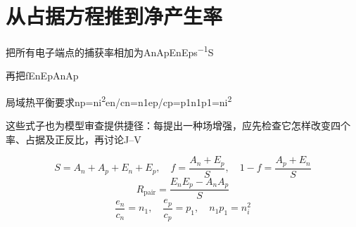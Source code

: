 \documentclass[11pt,a4paper]{article}
\begin{document}
\section{{\cjkfont 从占据方程推到净产生率}\allowbreak{}}\label{sec:14}
{\cjkfont 把所有电子端点的捕获率相加为}\allowbreak{}An\allowbreak{}Ap\allowbreak{}En\allowbreak{}Ep\allowbreak{}s\textsuperscript{−1}\allowbreak{}S\allowbreak{}
\par
{\cjkfont 再把}\allowbreak{}f\allowbreak{}EnEp\allowbreak{}AnAp\allowbreak{}
\par
{\cjkfont 局域热平衡要求}\allowbreak{}np=\allowbreak{}ni\textsuperscript{2}\allowbreak{}en/cn=\allowbreak{}n1\allowbreak{}ep/cp=\allowbreak{}p1\allowbreak{}n1p1=\allowbreak{}ni\textsuperscript{2}\allowbreak{}
\par
{\cjkfont 这些式子也为模型审查提供捷径：每提出一种场增强，应先检查它怎样改变四个率、占据及正反比，再讨论}\allowbreak{}J–V\allowbreak{}
\par
\begin{equation}
S=A_n+A_p+E_n+E_p,\quad f=\frac{A_n+E_p}{S},\quad 1-f=\frac{A_p+E_n}{S}
\label{eq:11}\end{equation}
\begin{equation}
R_{\mathrm{pair}}=\frac{E_nE_p-A_nA_p}{S}
\label{eq:12}\end{equation}
\begin{equation}
\frac{e_n}{c_n}=n_1,\quad\frac{e_p}{c_p}=p_1,\quad n_1p_1=n_i^2
\label{eq:13}\end{equation}
\end{document}

